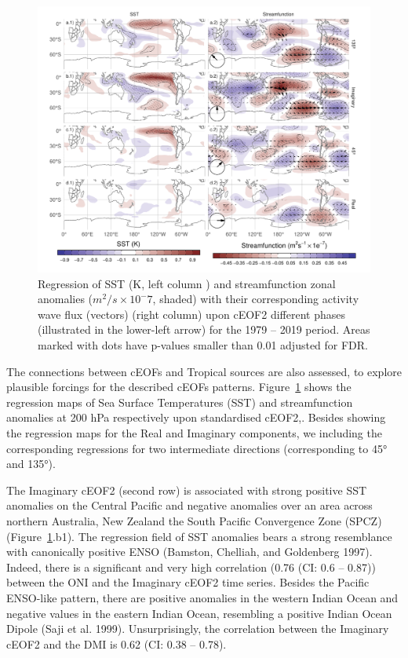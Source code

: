 \documentclass[smallextended]{svjour3}       %
\begin{document}
\begin{figure}
\includegraphics{../figures/sst-psi-2-1} \caption{Regression of SST (K, left column ) and streamfunction zonal anomalies (\(m^2/s\times10^-7\), shaded) with their corresponding activity wave flux (vectors) (right column) upon cEOF2 different phases (illustrated in the lower-left arrow) for the 1979 -- 2019 period. Areas marked with dots have p-values smaller than 0.01 adjusted for FDR.}\label{fig:sst-psi-2}
\end{figure}



The connections between cEOFs and Tropical sources are also assessed, to explore plausible forcings for the described cEOFs patterns.
Figure~\ref{fig:sst-psi-2} shows the regression maps of Sea Surface Temperatures (SST) and streamfunction anomalies at 200 hPa respectively upon standardised cEOF2,.
Besides showing the regression maps for the Real and Imaginary components, we including the corresponding regressions for two intermediate directions (corresponding to 45° and 135°).

The Imaginary cEOF2 (second row) is associated with strong positive SST anomalies on the Central Pacific and negative anomalies over an area across northern Australia, New Zealand the South Pacific Convergence Zone (SPCZ) (Figure~\ref{fig:sst-psi-2}.b1).
The regression field of SST anomalies bears a strong resemblance with canonically positive ENSO (Bamston, Chelliah, and Goldenberg 1997).
Indeed, there is a significant and very high correlation (0.76 (CI: 0.6 -- 0.87)) between the ONI and the Imaginary cEOF2 time series.
Besides the Pacific ENSO-like pattern, there are positive anomalies in the western Indian Ocean and negative values in the eastern Indian Ocean, resembling a positive Indian Ocean Dipole (Saji et al. 1999).
Unsurprisingly, the correlation between the Imaginary cEOF2 and the DMI is 0.62 (CI: 0.38 -- 0.78).
\end{document}
